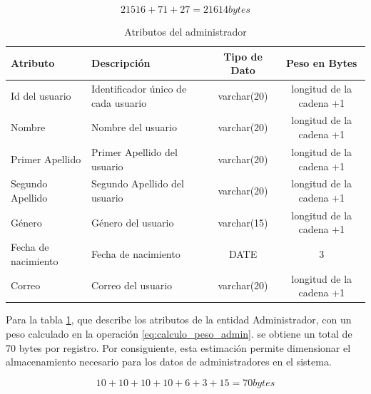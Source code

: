 \begin{equation}
21516 + 71 + 27 = 21614 bytes
\label{eq:calculo_peso_total_usuario}
\end{equation}

\begin{table}[htbp]
    \centering
    \caption{Atributos del administrador} %
    \label{tab:Dato3}
    \footnotesize %

    \begin{tabular}{|>{\raggedright\arraybackslash}p{2.4cm}|>{\raggedright\arraybackslash}p{5.5cm}|c|c|}
        \hline
        \textbf{Atributo} & \textbf{Descripción} & \textbf{Tipo de Dato} & \textbf{Peso en Bytes} \\ \hline
        Id del usuario & Identificador único de cada usuario & varchar(20) & longitud de la cadena +1 \\ \hline
        Nombre & Nombre del usuario & varchar(20) & longitud de la cadena +1 \\ \hline %
        Primer Apellido & Primer Apellido del usuario & varchar(20) & longitud de la cadena +1 \\ \hline
        Segundo Apellido & Segundo Apellido del usuario & varchar(20) & longitud de la cadena +1 \\ \hline
        Género & Género del usuario & varchar(15) & longitud de la cadena +1 \\ \hline
        Fecha de nacimiento & Fecha de nacimiento & DATE & 3 \\ \hline
        Correo & Correo del usuario & varchar(20) & longitud de la cadena +1 \\ \hline
    \end{tabular}
\end{table}


Para la tabla \ref{tab:Dato3}, que describe los atributos de
la entidad Administrador, con un peso calculado en la operación \ref{eq:calculo_peso_admin}. 
se obtiene un total de 70 bytes por registro. Por consiguiente, esta estimación 
permite dimensionar el almacenamiento necesario para los datos de administradores 
en el sistema.

\begin{equation}
10 + 10 + 10 + 10 + 6 + 3 + 15 = 70 bytes
\label{eq:calculo_peso_admin}
\end{equation}